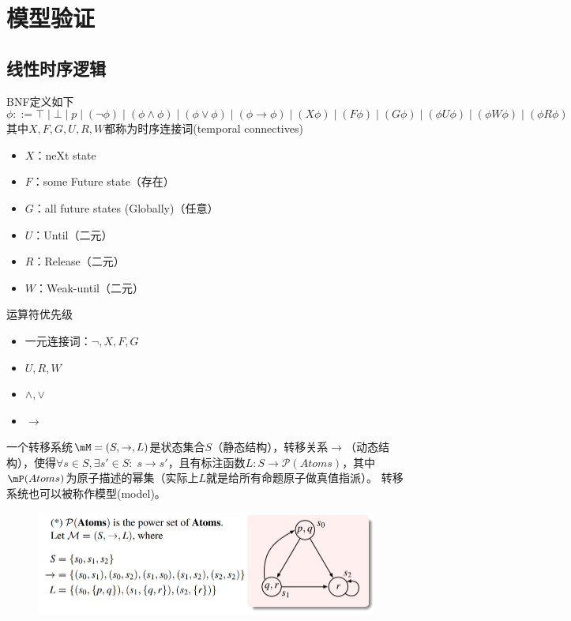 
\section{模型验证}
\subsection{线性时序逻辑}
\begin{definition}
BNF定义如下
\[\phi::=\top\mid\bot\mid p\mid
(\lnot\phi)\mid
(\phi\land\phi)\mid
(\phi\lor\phi)\mid
(\phi\to\phi)\mid
(X\phi)\mid
(F\phi)\mid
(G\phi)\mid
(\phi U\phi)\mid
(\phi W\phi)\mid
(\phi R\phi)\]
其中$X,F,G,U,R,W$都称为时序连接词(temporal connectives)
\begin{itemize}
	\item $X$：neXt state
	\item $F$：some Future state（存在）
	\item $G$：all future states (Globally)（任意）
	\item $U$：Until（二元）
	\item $R$：Release（二元）
	\item $W$：Weak-until（二元）
\end{itemize}
运算符优先级
\begin{itemize}
	\item 一元连接词：$\lnot,X,F,G$
	\item $U,R,W$
	\item $\land,\lor$
	\item $\to$
\end{itemize}
\end{definition}
\begin{definition}
一个转移系统$\mM=(S,\to,L)$是状态集合$S$（静态结构），转移关系$\to$（动态结构），使得$\forall s\in S,\exists s'\in S:\;s\to s'$，且有标注函数$L:S\to\mathcal{P}(Atoms)$，其中$\mP(Atoms)$为原子描述的幂集（实际上$L$就是给所有命题原子做真值指派）。
转移系统也可以被称作模型(model)。
\end{definition}
\begin{figure}[H]
\centering
\includegraphics[width=0.8\linewidth]{fig/transition_system.jpg}
\end{figure}
